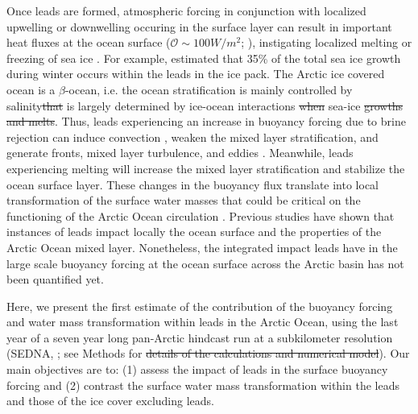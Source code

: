 \documentclass[lineno,sn-basic]{sn-jnl}%
\providecommand{\DIFadd}[1]{{\protect\color{blue}\uwave{#1}}} %
\providecommand{\DIFdel}[1]{{\protect\color{red}\sout{#1}}}                      %
\providecommand{\DIFaddbegin}{} %
\providecommand{\DIFaddend}{} %
\providecommand{\DIFdelbegin}{} %
\providecommand{\DIFdelend}{} %
\newcommand{\DIFscaledelfig}{0.5}
\newlength{\DIFdelgraphicswidth} %
\newlength{\DIFdelgraphicsheight} %
\newcommand{\DIFaddincludegraphics}[2][]{{\color{blue}\fbox{\DIFOincludegraphics[#1]{#2}}}} %
\newcommand{\DIFdelincludegraphics}[2][]{%
\sbox{\DIFdelgraphicsbox}{\DIFOincludegraphics[#1]{#2}}%
\settoboxwidth{\DIFdelgraphicswidth}{\DIFdelgraphicsbox} %
\settoboxtotalheight{\DIFdelgraphicsheight}{\DIFdelgraphicsbox} %
\scalebox{\DIFscaledelfig}{%
\parbox[b]{\DIFdelgraphicswidth}{\usebox{\DIFdelgraphicsbox}\\[-\baselineskip] \rule{\DIFdelgraphicswidth}{0em}}\llap{\resizebox{\DIFdelgraphicswidth}{\DIFdelgraphicsheight}{%
\setlength{\unitlength}{\DIFdelgraphicswidth}%
\begin{picture}(1,1)%
\thicklines\linethickness{2pt} %
{\color[rgb]{1,0,0}\put(0,0){\framebox(1,1){}}}%
{\color[rgb]{1,0,0}\put(0,0){\line( 1,1){1}}}%
{\color[rgb]{1,0,0}\put(0,1){\line(1,-1){1}}}%
\end{picture}%
}\hspace*{3pt}}} %
} %
\DeclareRobustCommand{\DIFaddbegin}{\DIFOaddbegin \let\includegraphics\DIFaddincludegraphics} %
\DeclareRobustCommand{\DIFaddend}{\DIFOaddend \let\includegraphics\DIFOincludegraphics} %
\DeclareRobustCommand{\DIFdelbegin}{\DIFOdelbegin \let\includegraphics\DIFdelincludegraphics} %
\DeclareRobustCommand{\DIFdelend}{\DIFOaddend \let\includegraphics\DIFOincludegraphics} %
\begin{document}
Once leads are formed, atmospheric forcing in conjunction with localized upwelling or downwelling occuring in the surface layer can result in important heat fluxes at the ocean surface ($\mathcal{O} \sim 100 W/m^2$; \citealp{Bourgault_flux_lkf_2020,McPhee_LKF_2005,Marcq_flux_lead_2012,Maykut_heat_1986}), instigating localized melting or freezing of sea ice \citep{Albedyll_thickness_dis_2022}. For example, \citet{Boutin_rheology_2023} estimated that 35\% of the total sea ice growth during winter occurs within the leads in the ice pack. The Arctic ice covered ocean is a $\beta$-ocean, i.e. the ocean stratification is mainly controlled by salinity\DIFdelbegin \DIFdel{that }\DIFdelend \DIFaddbegin \DIFadd{, which in turn }\DIFaddend is largely determined by ice-ocean interactions \DIFdelbegin \DIFdel{when }\DIFdelend \DIFaddbegin \DIFadd{(}\DIFaddend sea-ice \DIFdelbegin \DIFdel{growths and melts}\DIFdelend \DIFaddbegin \DIFadd{growth and melt)}\DIFaddend . Thus, leads experiencing an increase in buoyancy forcing due to brine rejection can induce convection \citep{Smith_convection_1998}, weaken the mixed layer stratification, and generate fronts, mixed layer turbulence, and eddies \citep{Reiser_LKF_2020, Smith_generation_2002}. Meanwhile, leads experiencing melting will increase the mixed layer stratification and stabilize the ocean surface layer. These changes in the buoyancy flux translate into local transformation of the surface water masses that could be critical on the functioning of the Arctic Ocean circulation \citep{Lenn_mixing_2022, Pemberton_WMT_2015, Smith_polynyas_1990}. 
Previous studies have shown that instances of leads impact locally the ocean surface and the properties of the Arctic Ocean mixed layer. Nonetheless, the integrated impact leads have in the large scale buoyancy forcing at the ocean surface across the Arctic basin has not been quantified yet.

Here, we present the first estimate of the contribution of the buoyancy forcing and water mass transformation within leads in the Arctic Ocean, using the last year of a seven year long pan-Arctic hindcast run at a subkilometer resolution (SEDNA, \citealp{SEDNA_2023}; see Methods for \DIFdelbegin \DIFdel{details of the calculations and numerical model}\DIFdelend \DIFaddbegin \DIFadd{more details}\DIFaddend ). Our main objectives are to: (1) assess the impact of leads in the surface buoyancy forcing and (2) contrast the surface water mass transformation within the leads and those of the ice cover excluding leads.
\end{document}
